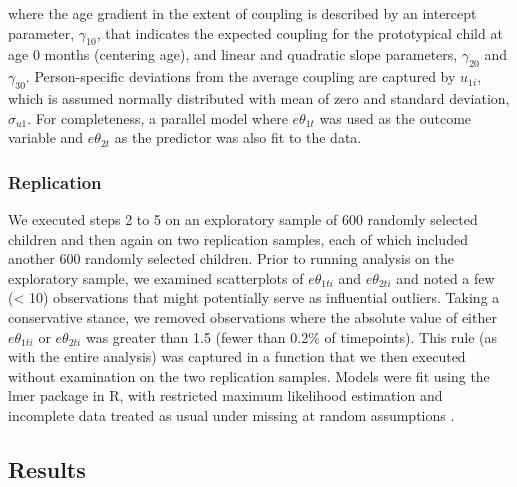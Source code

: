\documentclass[man, floatsintext]{apa7}
\begin{document}
\noindent where the age gradient in the extent of coupling is
described by an intercept parameter, $\gamma_{10}$, that indicates the
expected coupling for the prototypical child at age 0 months (centering
age), and linear and quadratic slope parameters, $\gamma_{20}$ and
$\gamma_{30}$. Person-specific deviations from the average coupling
are captured by $u_{1i}$, which is assumed normally distributed with
mean of zero and standard deviation, $\sigma_{u1}$. For completeness,
a parallel model where $e\theta_{1t}$ was used as the outcome variable
and $e\theta_{2t}$ as the predictor was also fit to the data.

\subsubsection{Replication}

We executed steps 2 to 5 on an exploratory sample of 600 randomly selected children and then again on two replication
samples, each of which included another 600 randomly selected children. Prior to
running analysis on the exploratory sample, we examined scatterplots of
$e\theta_{1ti}$ and $e\theta_{2ti}$ and noted a few (\textless{} 10)
observations that might potentially serve as influential outliers.
Taking a conservative stance, we removed observations where the absolute
value of either $e\theta_{1ti}$ or $e\theta_{2ti}$ was greater than
1.5 (fewer than 0.2\% of timepoints). This rule (as with the entire
analysis) was captured in a function that we then executed without
examination on the two replication samples. Models were fit using the
lmer package in R, with restricted maximum likelihood estimation and
incomplete data treated as usual under missing at random assumptions
\parencite{bates2005}.


\subsection{Results}
\end{document}
